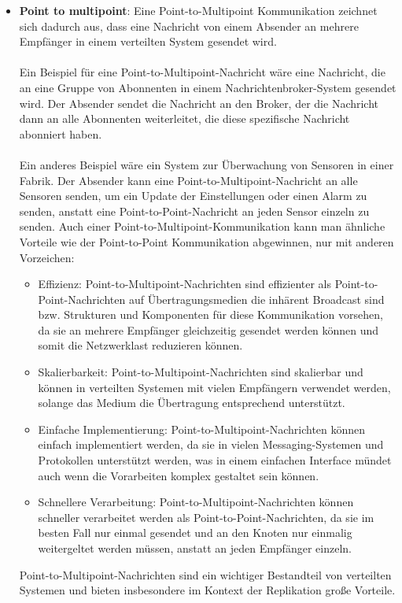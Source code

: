 \begin{itemize}
\item \textbf{Point to multipoint}: Eine Point-to-Multipoint Kommunikation zeichnet sich dadurch aus, dass eine Nachricht von einem Absender an mehrere Empfänger in einem verteilten System gesendet wird. 
\\\\
Ein Beispiel für eine Point-to-Multipoint-Nachricht wäre eine Nachricht, die an eine Gruppe von Abonnenten in einem Nachrichtenbroker-System gesendet wird. Der Absender sendet die Nachricht an den Broker, der die Nachricht dann an alle Abonnenten weiterleitet, die diese spezifische Nachricht abonniert haben.
\\\\
Ein anderes Beispiel wäre ein System zur Überwachung von Sensoren in einer Fabrik. Der Absender kann eine Point-to-Multipoint-Nachricht an alle Sensoren senden, um ein Update der Einstellungen oder einen Alarm zu senden, anstatt eine Point-to-Point-Nachricht an jeden Sensor einzeln zu senden.  Auch einer Point-to-Multipoint-Kommunikation kann man ähnliche Vorteile wie der Point-to-Point Kommunikation abgewinnen, nur mit anderen Vorzeichen:
\begin{itemize}
\item Effizienz: Point-to-Multipoint-Nachrichten sind effizienter als Point-to-Point-Nachrichten auf Übertragungsmedien die inhärent Broadcast sind bzw. Strukturen und Komponenten für diese Kommunikation vorsehen, da sie an mehrere Empfänger gleichzeitig gesendet werden können und somit die Netzwerklast reduzieren können.
\item Skalierbarkeit: Point-to-Multipoint-Nachrichten sind skalierbar und können in verteilten Systemen mit vielen Empfängern verwendet werden, solange das Medium die Übertragung entsprechend unterstützt.
\item Einfache Implementierung: Point-to-Multipoint-Nachrichten können einfach implementiert werden, da sie in vielen Messaging-Systemen und Protokollen unterstützt werden, was in einem einfachen Interface mündet auch wenn die Vorarbeiten komplex gestaltet sein können.
\item Schnellere Verarbeitung: Point-to-Multipoint-Nachrichten können schneller verarbeitet werden als Point-to-Point-Nachrichten, da sie im besten Fall nur einmal gesendet und an den Knoten nur einmalig weitergeltet werden müssen, anstatt an jeden Empfänger einzeln.
\end{itemize}
Point-to-Multipoint-Nachrichten sind ein wichtiger Bestandteil von verteilten Systemen und bieten insbesondere im Kontext der Replikation große Vorteile.

\end{itemize}
